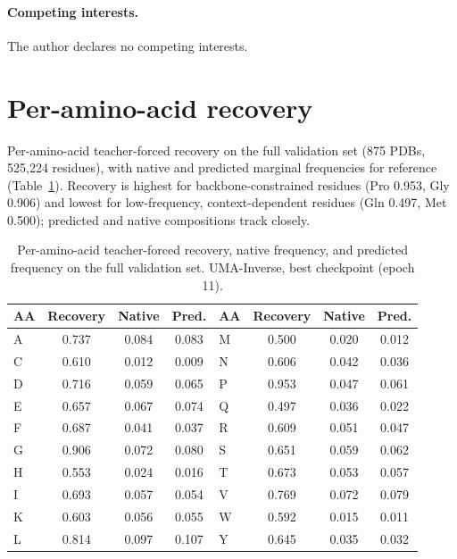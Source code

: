 \documentclass[11pt,letterpaper]{article}
\begin{document}
\paragraph{Competing interests.}
The author declares no competing interests.

\appendix
\clearpage

\section{Per-amino-acid recovery}
\label{sec:aa_recovery}

Per-amino-acid teacher-forced recovery on the full validation set (875 PDBs, 525{,}224 residues),
with native and predicted marginal frequencies for reference (Table~\ref{tab:peraacov}). Recovery is
highest for backbone-constrained residues (Pro 0.953, Gly 0.906) and lowest for low-frequency,
context-dependent residues (Gln 0.497, Met 0.500); predicted and native compositions track closely.

\begin{table}[!ht]
\centering
\caption{Per-amino-acid teacher-forced recovery, native frequency, and predicted frequency on the
  full validation set. UMA-Inverse, best checkpoint (epoch 11).}
\label{tab:peraacov}
\begin{tabular}{lccc@{\hskip 2em}lccc}
\toprule
AA & Recovery & Native & Pred. & AA & Recovery & Native & Pred. \\
\midrule
A & 0.737 & 0.084 & 0.083 & M & 0.500 & 0.020 & 0.012 \\
C & 0.610 & 0.012 & 0.009 & N & 0.606 & 0.042 & 0.036 \\
D & 0.716 & 0.059 & 0.065 & P & 0.953 & 0.047 & 0.061 \\
E & 0.657 & 0.067 & 0.074 & Q & 0.497 & 0.036 & 0.022 \\
F & 0.687 & 0.041 & 0.037 & R & 0.609 & 0.051 & 0.047 \\
G & 0.906 & 0.072 & 0.080 & S & 0.651 & 0.059 & 0.062 \\
H & 0.553 & 0.024 & 0.016 & T & 0.673 & 0.053 & 0.057 \\
I & 0.693 & 0.057 & 0.054 & V & 0.769 & 0.072 & 0.079 \\
K & 0.603 & 0.056 & 0.055 & W & 0.592 & 0.015 & 0.011 \\
L & 0.814 & 0.097 & 0.107 & Y & 0.645 & 0.035 & 0.032 \\
\bottomrule
\end{tabular}
\end{table}
\end{document}
